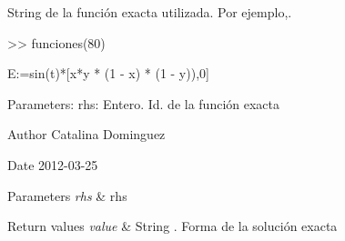 String de la función exacta utilizada. Por ejemplo,. 


\begin{DoxyCode}
 >> funciones(80)  
\end{DoxyCode}
 \begin{DoxyVerb}     E:=sin(t)*[x*y * (1 - x) * (1 - y)),0]\end{DoxyVerb}
 Parameters\-: rhs\-: Entero. Id. de la función exacta

\begin{DoxyAuthor}{Author}
Catalina Dominguez 
\end{DoxyAuthor}
\begin{DoxyDate}{Date}
2012-\/03-\/25
\end{DoxyDate}

\begin{DoxyParams}{Parameters}
{\em rhs} & rhs\\
\hline
\end{DoxyParams}

\begin{DoxyRetVals}{Return values}
{\em value} & String . Forma de la solución exacta \\
\hline
\end{DoxyRetVals}
